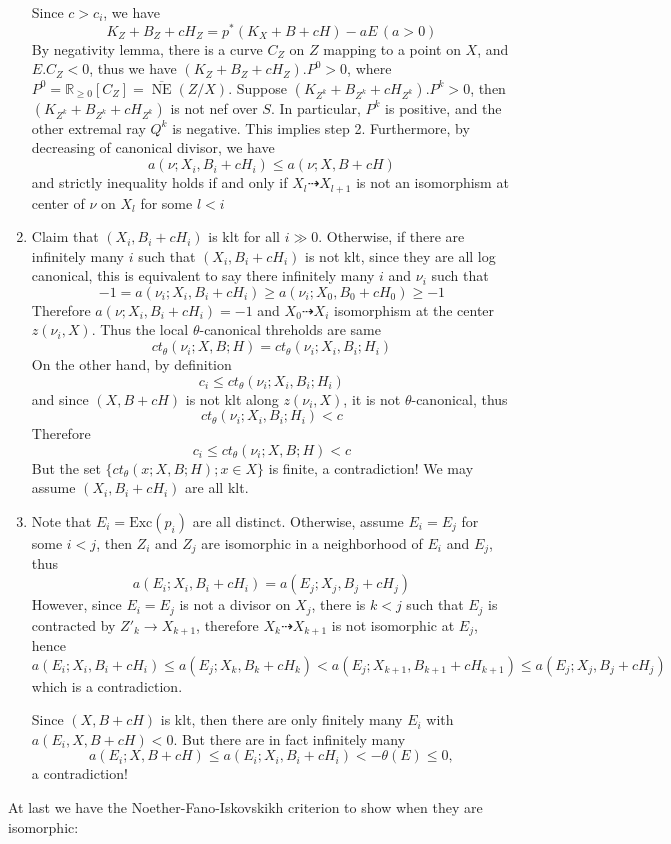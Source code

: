 \documentclass{article}
\begin{document}
\begin{enumerate}
  Since $ c>c_i $, we have 
  \[ K_Z+B_Z+cH_Z=p^*(K_X+B+cH)-aE\,(a>0) \]
  By negativity lemma, there is a curve $ C_Z $ on $ Z $ mapping to a point on $ X $, and $ E.C_Z<0 $, thus we have $ (K_Z+B_Z+cH_Z).P^0>0 $, where $ P^0=\mathbb{R}_{\geqslant0}[C_Z]=\overline{\operatorname{NE}}(Z/X) $. Suppose
  $(K_{Z^k}+B_{Z^k}+cH_{Z^k}).P^k>0$, then $ (K_{Z^k}+B_{Z^k}+cH_{Z^k}) $ is not nef over $ S $. In particular,  $ P^k $ is positive, and the other extremal ray $ Q^k $ is negative. This implies step 2. 
  Furthermore, by decreasing of canonical divisor, we have
  \[ a(\nu;X_i,B_i+cH_i)\leqslant a(\nu;X,B+cH) \]
  and strictly inequality holds if and only if $ X_l\dashrightarrow X_{l+1} $ is not an isomorphism at center of $ \nu $ on $ X_l $ for some $ l<i $
  \item Claim that $ (X_i,B_i+cH_i) $ is klt for all $ i\gg 0 $. Otherwise, if there are infinitely many $ i $ such that $ (X_i,B_i+cH_i) $ is not klt, since they are all log canonical, this is equivalent to say there infinitely many $ i $ and $ \nu_i $ such that
  \[ -1=a(\nu_i;X_i,B_i+cH_i)\geqslant a(\nu_i;X_0,B_0+cH_0)\geqslant -1  \]
  Therefore $ a(\nu;X_i,B_i+cH_i)=-1 $ and $ X_0\dashrightarrow X_i $ isomorphism at the center $ z(\nu_i,X) $. Thus the local $ \theta $-canonical threholds are same
\[ ct_{\theta}(\nu_i;X,B;H)=ct_{\theta}(\nu_i;X_i,B_i;H_i) \]
  On the other hand, by definition
  \[ c_i \leqslant ct_{\theta}(\nu_i;X_i,B_i;H_i) \]
  and since $ (X,B+cH) $ is not klt along $ z(\nu_i,X) $, it is not $ \theta $-canonical, thus
  \[ ct_{\theta}(\nu_i;X_i,B_i;H_i)<c \]
  Therefore
  \[ c_i\leqslant ct_{\theta}(\nu_i;X,B;H)<c \]
  But the set $\{ ct_{\theta}(x;X,B;H);x\in X\} $ is finite, a contradiction! We may assume $ (X_i,B_i+cH_i) $ are all klt.
  \item Note that $ E_i=\mathrm{Exc}(p_i) $ are all distinct. Otherwise, assume $ E_i=E_j $ for some $ i<j $, then $ Z_i $ and $ Z_j $ are isomorphic in a neighborhood of $ E_i $ and $ E_j $, thus 
  \[ a(E_i;X_i,B_i+cH_i)=a(E_j;X_j,B_j+cH_j) \]
  However, since $ E_i=E_j $ is not a divisor on $ X_j $, there is $ k<j $ such that $ E_j $ is contracted by $ Z'_k\to X_{k+1} $, therefore $ X_k\dashrightarrow X_{k+1} $ is not isomorphic at $ E_j $, hence 
  \[ a(E_i;X_i,B_i+cH_i)\leqslant a(E_j;X_k,B_k+cH_k)<a(E_j;X_{k+1},B_{k+1}+cH_{k+1})\leqslant a(E_j;X_j,B_j+cH_j) \]  
  which is a contradiction.
  
  Since $ (X,B+cH) $ is klt, then there are only finitely many $ E_i $ with $ a(E_i,X,B+cH)<0 $. But there are in fact infinitely many
  \[ a(E_i;X,B+cH)\leqslant  a(E_i;X_i,B_i+cH_i)<-\theta (E)\leqslant 0 ,\] 
  a contradiction! 
\end{enumerate}
At last we have the Noether-Fano-Iskovskikh criterion to show when they are isomorphic:
\end{document}
